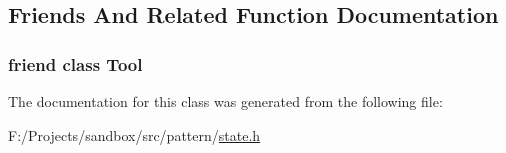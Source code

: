 \subsection{Friends And Related Function Documentation}
\hypertarget{classsandbox_1_1pattern_1_1_tool_controller_a76e9adf1d0321729d4b28ce85a6825fd}{
\subsubsection[{Tool}]{\setlength{\rightskip}{0pt plus 5cm}friend class {\bf Tool}\hspace{0.3cm}{\ttfamily [friend]}}}\label{classsandbox_1_1pattern_1_1_tool_controller_a76e9adf1d0321729d4b28ce85a6825fd}


The documentation for this class was generated from the following file\-:\begin{DoxyCompactItemize}
\item 
F\-:/\-Projects/sandbox/src/pattern/\hyperlink{state_8h}{state.\-h}\end{DoxyCompactItemize}
